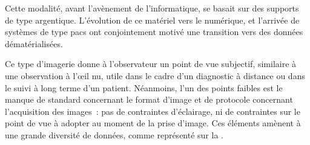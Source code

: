 Cette modalité, avant l’avènement de l’informatique, se basait sur des supports de type argentique. L’évolution de ce matériel vers le numérique, et l’arrivée de systèmes de type \gls{pacs} ont conjointement motivé une transition vers des données dématérialisées.\par

Ce type d’imagerie donne à l’observateur un point de vue subjectif, similaire à une observation à l’œil nu, utile dans le cadre d’un diagnostic à distance ou dans le suivi à long terme d’un patient. Néanmoins, l'un des points faibles est le manque de standard concernant le format d'image et de protocole concernant l'acquisition des images~: pas de contraintes d'éclairage, ni de contraintes sur le point de vue à adopter au moment de la prise d'image. Ces éléments amènent à une grande diversité de données, comme représenté sur la .\par


